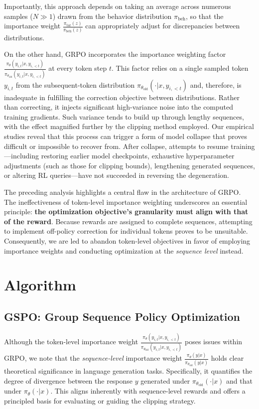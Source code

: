 Importantly, this approach depends on taking an average across numerous samples ($N \gg 1$) drawn from the behavior distribution $\pi_\text{beh}$, so that the importance weight $\frac{ \pi_\text{tar} (z) }{ \pi_\text{beh} (z)}$ can appropriately adjust for discrepancies between distributions.

On the other hand, GRPO incorporates the importance weighting factor $\frac{ \pi_{\theta} (y_{i,t} | x, y_{i,<t}) }{ \pi_{\theta_\text{old}} (y_{i,t} | x,y_{i,<t})}$ at every token step $t$. This factor relies on a single sampled token $y_{i,t}$ from the subsequent-token distribution $\pi_{\theta_\text{old}}( \cdot | x, y_{i, <t})$ and, therefore, is inadequate in fulfilling the correction objective between distributions. Rather than correcting, it injects significant high-variance noise into the computed training gradients. Such variance tends to build up through lengthy sequences, with the effect magnified further by the clipping method employed. Our empirical studies reveal that this process can trigger a form of model collapse that proves difficult or impossible to recover from. After collapse, attempts to resume training—including restoring earlier model checkpoints, exhaustive hyperparameter adjustments (such as those for clipping bounds), lengthening generated sequences, or altering RL queries—have not succeeded in reversing the degeneration.

The preceding analysis highlights a central flaw in the architecture of GRPO. The ineffectiveness of token-level importance weighting underscores an essential principle: \textbf{the optimization objective's granularity must align with that of the reward}. Because rewards are assigned to complete sequences, attempting to implement off-policy correction for individual tokens proves to be unsuitable. Consequently, we are led to abandon token-level objectives in favor of employing importance weights and conducting optimization at the \textit{sequence level} instead.

\section{Algorithm}

\subsection{GSPO: Group Sequence Policy Optimization}

Although the token-level importance weight $\frac{ \pi_{\theta} (y_{i,t} | x, y_{i,<t}) }{ \pi_{\theta_\text{old}} (y_{i,t} | x,y_{i,<t})}$ poses issues within GRPO, we note that the \textit{sequence-level} importance weight $\frac{ \pi_{\theta} (y | x) }{ \pi_{\theta_\text{old}} (y | x)}$ holds clear theoretical significance in language generation tasks. Specifically, it quantifies the degree of divergence between the response $y$ generated under $\pi_{\theta_\text{old}} (\cdot | x)$ and that under $\pi_{\theta} (\cdot | x)$. This aligns inherently with sequence-level rewards and offers a principled basis for evaluating or guiding the clipping strategy.

